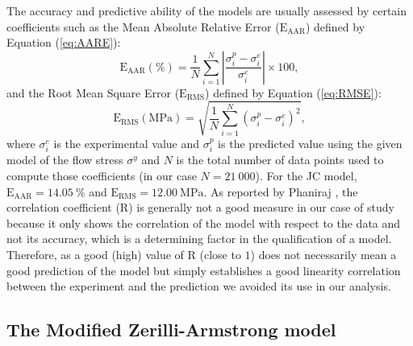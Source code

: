 \documentclass[twoside,english,1p,final,sort&compress]{elsarticle}
\theoremstyle{plain}
\DeclareRobustCommand{\RMSE}{\text{E}_\text{RMS}}
\DeclareRobustCommand{\AARE}{\text{E}_\text{AAR}}
\DeclareRobustCommand{\R}{\text{R}}
\DeclareRobustCommand{\MPa}{\text{MPa}}
\begin{document}
The accuracy and predictive ability of the models are usually assessed by certain coefficients such as the Mean Absolute Relative Error ($\AARE$) defined by Equation (\ref{eq:AARE}):
\begin{equation}
\AARE(\%) = \frac{1}{N} \sum_{i=1}^{N}{\left|\frac{\sigma_i^p -\sigma_i^e}{\sigma_i^e}\right|} \times 100, \label{eq:AARE}
\end{equation}
and the Root Mean Square Error ($\RMSE$) defined by Equation (\ref{eq:RMSE}):
\begin{equation}
\RMSE (\MPa) = \sqrt{\frac{1}{N} \sum_{i=1}^{N} \left(\sigma_i^p - \sigma_i^e\right)^2}, \label{eq:RMSE}
\end{equation}
where $\sigma_i^e$ is the experimental value and $\sigma_i^p$ is the predicted value using the given model of the flow stress $\sigma^y$ and $N$ is the total number of data points used to compute those coefficients (in our case $N=21~000$).
For the JC model, $\AARE=14.05~\%$ and $\RMSE=12.00~\MPa$.
As reported by Phaniraj \cite{Phaniraj-2003}, the correlation coefficient ($\R$) is generally not a good measure in our case of study because it only shows the correlation of the model with respect to the data and not its accuracy, which is a determining factor in the qualification of a model.
Therefore, as a good (high) value of $\R$ (close to $1$) does not necessarily mean a good prediction of the model but simply establishes a good linearity correlation between the experiment and the prediction we avoided its use in our analysis.

\subsection{The Modified Zerilli-Armstrong model\label{sec:MZA}}
\end{document}
